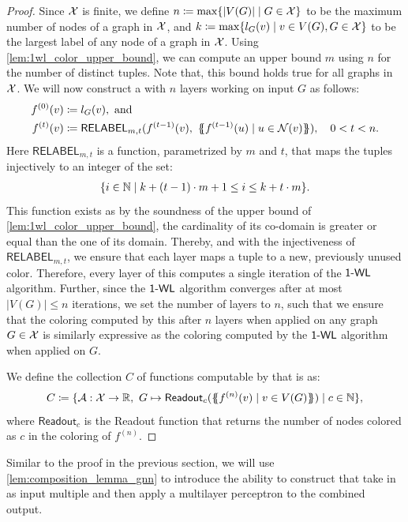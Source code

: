 \begin{proof}
Since $\mathcal{X}$ is finite, we define $n \coloneqq \max \{ |V(G)| \mid G \in \mathcal{X} \}$ to be the maximum number of nodes of a graph in $\mathcal{X}$, and $k \coloneqq \max \{ l_G(v) \mid v \in V(G), G \in \mathcal{X} \}$ to be the largest label of any node of a graph in $\mathcal{X}$. Using \cref{lem:1wl_color_upper_bound}, we can compute an upper bound $m$ using $n$ for the number of distinct tuples. Note that, this bound holds true for all graphs in $\mathcal{X}$. We will now construct a \gnn with $n$ layers working on input $G$ as follows:
\begin{align*}
    f^{(0)}(v) &\coloneqq l_G(v), \ \text{and}\\
    f^{(t)}(v) &\coloneqq \textsf{RELABEL}_{m,t}(f^{(t-1)}(v), \ \MSopen f^{(t-1)}(u) \mid u \in \cN(v)\MSclose), \quad 0 < t < n.
\end{align*}
Here $\textsf{RELABEL}_{m,t}$ is a function, parametrized by $m$ and $t$, that maps the tuples injectively to an integer of the set:
\begin{align*}\{i \in \mathbb{N} \mid k + (t-1)\cdot m +1 \leq i \leq k + t \cdot m\}.
\end{align*}
This function exists as by the soundness of the upper bound of \cref{lem:1wl_color_upper_bound}, the cardinality of its co-domain is greater or equal than the one of its domain. Thereby, and with the injectiveness of $\textsf{RELABEL}_{m,t}$, we ensure that each \gnn layer maps a tuple to a new, previously unused color. Therefore, every layer of this \gnn computes a single iteration of the $\textsf{1-WL}$ algorithm. Further, since the $\textsf{1-WL}$ algorithm converges after at most $|V(G)| \leq n$ iterations, we set the number of layers to $n$, such that we ensure that the coloring computed by this \gnn after $n$ layers when applied on any graph $G \in \mathcal{X}$ is similarly expressive as the coloring computed by the $\textsf{1-WL}$ algorithm when applied on $G$.

We define the collection $C$ of functions computable by \gnns that is \wldisc as: 
\begin{align*}
    C \coloneqq \{ \mathcal{A}: \mathcal{X} \rightarrow \mathbb{R}, \ G \mapsto \textsf{Readout}_c(\{\!\!\{ f^{(n)}(v) \mid v \in V(G) \}\!\!\}) \mid c \in \mathbb{N} \},
\end{align*}
where $\textsf{Readout}_c$ is the \textsf{Readout} function that returns the number of nodes colored as $c$ in the coloring of $f^{(n)}$.
\end{proof}

Similar to the proof in the previous section, we will use \cref{lem:composition_lemma_gnn} to introduce the ability to construct \gnns that take in as input multiple \gnns and then apply a multilayer perceptron to the combined output.

